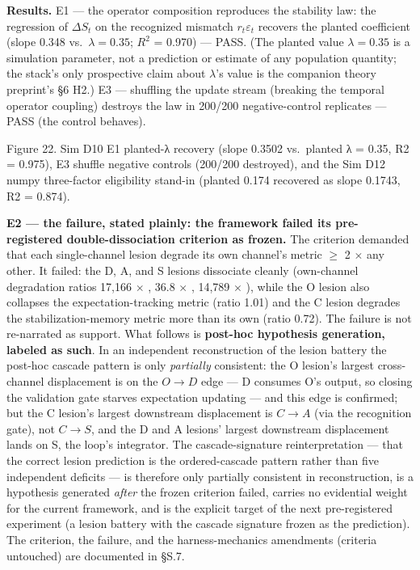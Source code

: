 \documentclass[
]{article}
\begin{document}
\textbf{Results.} E1 --- the operator composition reproduces the
stability law: the regression of \(\Delta S_t\) on the recognized
mismatch \(r_t\varepsilon_t\) recovers the planted coefficient (slope
0.348 vs.~\(\lambda = 0.35\); \(R^{2}\) = 0.970) --- PASS. (The planted
value \(\lambda = 0.35\) is a simulation parameter, not a prediction or
estimate of any population quantity; the stack's only prospective claim
about \(\lambda\)'s value is the companion theory preprint's §6 H2.) E3
--- shuffling the update stream (breaking the temporal operator
coupling) destroys the law in 200/200 negative-control replicates ---
PASS (the control behaves).

Figure 22. Sim D10 E1 planted-{λ} recovery (slope 0.3502 vs.~planted
{λ = 0.35}, {R2 = 0.975}), E3 shuffle negative controls (200/200
destroyed), and the Sim D12 numpy three-factor eligibility stand-in
(planted 0.174 recovered as slope 0.1743, {R2 = 0.874}).

\textbf{E2 --- the failure, stated plainly: the framework failed its
pre-registered double-dissociation criterion as frozen.} The criterion
demanded that each single-channel lesion degrade its own channel's
metric \(\geq\) 2 \(\times\) any other. It failed: the D, A, and S
lesions dissociate cleanly (own-channel degradation ratios 17,166
\(\times\) , 36.8 \(\times\) , 14,789 \(\times\) ), while the O lesion
also collapses the expectation-tracking metric (ratio 1.01) and the C
lesion degrades the stabilization-memory metric more than its own (ratio
0.72). The failure is not re-narrated as support. What follows is
\textbf{post-hoc hypothesis generation, labeled as such}. In an
independent reconstruction of the lesion battery the post-hoc cascade
pattern is only \emph{partially} consistent: the O lesion's largest
cross-channel displacement is on the \(O{\to}D\) edge --- D consumes O's
output, so closing the validation gate starves expectation updating ---
and this edge is confirmed; but the C lesion's largest downstream
displacement is \(C{\to}A\) (via the recognition gate), not \(C{\to}S\),
and the D and A lesions' largest downstream displacement lands on S, the
loop's integrator. The cascade-signature reinterpretation --- that the
correct lesion prediction is the ordered-cascade pattern rather than
five independent deficits --- is therefore only partially consistent in
reconstruction, is a hypothesis generated \emph{after} the frozen
criterion failed, carries no evidential weight for the current
framework, and is the explicit target of the next pre-registered
experiment (a lesion battery with the cascade signature frozen as the
prediction). The criterion, the failure, and the harness-mechanics
amendments (criteria untouched) are documented in §S.7.
\end{document}
